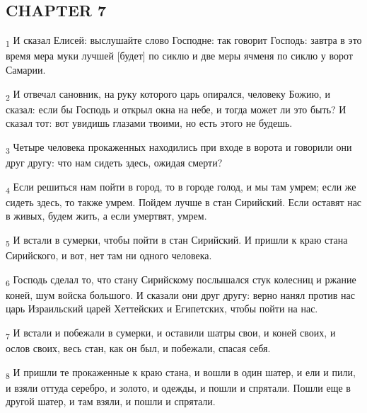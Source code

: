 \subsection{CHAPTER 7}
\begin{tcolorbox}
\textsubscript{1} И сказал Елисей: выслушайте слово Господне: так говорит Господь: завтра в это время мера муки лучшей [будет] по сиклю и две меры ячменя по сиклю у ворот Самарии.
\end{tcolorbox}
\begin{tcolorbox}
\textsubscript{2} И отвечал сановник, на руку которого царь опирался, человеку Божию, и сказал: если бы Господь и открыл окна на небе, и тогда может ли это быть? И сказал тот: вот увидишь глазами твоими, но есть этого не будешь.
\end{tcolorbox}
\begin{tcolorbox}
\textsubscript{3} Четыре человека прокаженных находились при входе в ворота и говорили они друг другу: что нам сидеть здесь, ожидая смерти?
\end{tcolorbox}
\begin{tcolorbox}
\textsubscript{4} Если решиться нам пойти в город, то в городе голод, и мы там умрем; если же сидеть здесь, то также умрем. Пойдем лучше в стан Сирийский. Если оставят нас в живых, будем жить, а если умертвят, умрем.
\end{tcolorbox}
\begin{tcolorbox}
\textsubscript{5} И встали в сумерки, чтобы пойти в стан Сирийский. И пришли к краю стана Сирийского, и вот, нет там ни одного человека.
\end{tcolorbox}
\begin{tcolorbox}
\textsubscript{6} Господь сделал то, что стану Сирийскому послышался стук колесниц и ржание коней, шум войска большого. И сказали они друг другу: верно нанял против нас царь Израильский царей Хеттейских и Египетских, чтобы пойти на нас.
\end{tcolorbox}
\begin{tcolorbox}
\textsubscript{7} И встали и побежали в сумерки, и оставили шатры свои, и коней своих, и ослов своих, весь стан, как он был, и побежали, спасая себя.
\end{tcolorbox}
\begin{tcolorbox}
\textsubscript{8} И пришли те прокаженные к краю стана, и вошли в один шатер, и ели и пили, и взяли оттуда серебро, и золото, и одежды, и пошли и спрятали. Пошли еще в другой шатер, и там взяли, и пошли и спрятали.
\end{tcolorbox}
